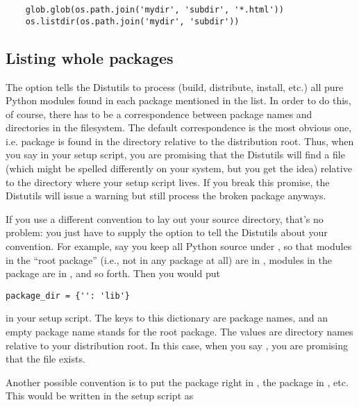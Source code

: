 \documentclass{howto}
\begin{document}
\begin{verbatim}
    glob.glob(os.path.join('mydir', 'subdir', '*.html'))
    os.listdir(os.path.join('mydir', 'subdir'))
\end{verbatim}


\subsection{Listing whole packages}
\label{listing-packages}

The  option tells the Distutils to process (build,
distribute, install, etc.) all pure Python modules found in each package
mentioned in the  list.  In order to do this, of
course, there has to be a correspondence between package names and
directories in the filesystem.  The default correspondence is the most
obvious one, i.e. package  is found in the directory
 relative to the distribution root.  Thus, when you say
 in your setup script, you are promising that
the Distutils will find a file  (which might
be spelled differently on your system, but you get the idea) relative to
the directory where your setup script lives.  If you break this
promise, the Distutils will issue a warning but still process the broken
package anyways.

If you use a different convention to lay out your source directory,
that's no problem: you just have to supply the 
option to tell the Distutils about your convention.  For example, say
you keep all Python source under , so that modules in the
``root package'' (i.e., not in any package at all) are in
, modules in the  package are in ,
and so forth.  Then you would put

\begin{verbatim}
package_dir = {'': 'lib'}
\end{verbatim}

in your setup script.  The keys to this dictionary are package names,
and an empty package name stands for the root package.  The values are
directory names relative to your distribution root.  In this case, when
you say , you are promising that the file
 exists.

Another possible convention is to put the  package right in 
, the  package in , etc.  This
would be written in the setup script as
\end{document}
